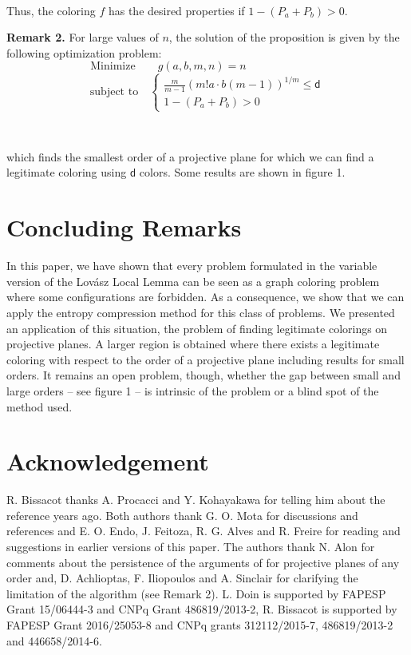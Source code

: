 \documentclass[11pt]{amsart}
\numberwithin{equation}{section}
\begin{document}
\

Thus, the coloring $f$ has the desired properties if $ 1 - (P_a + P_b) > 0$.\\

\medskip

\textbf{Remark 2.} For large values of $n$, the solution of the proposition is given by the following optimization problem:
$$ \text{Minimize} \quad \quad  g(a,b,m,n) = n \quad \quad \quad \quad \quad \quad \quad $$
$$ \text{subject to} \quad \begin{cases}
\frac{m}{m-1}(m!a \cdot b (m-1))^{1/m} \leq \mathsf{d} \\
 1 - (P_a + P_b) > 0

\end{cases} $$

\

which finds the smallest order of a projective plane for which we can find a legitimate coloring using $\mathsf{d}$ colors. Some results are shown in figure 1.

\section{Concluding Remarks}
In this paper, we have shown that every problem formulated in the variable version of the Lov\'asz Local Lemma can be seen as a graph coloring problem where some configurations are forbidden. As a consequence, we show that we can apply the entropy compression method for this class of problems. We presented an application of this situation, the problem of finding legitimate colorings on projective planes. A larger region is obtained where there exists a legitimate coloring with respect to the order of a projective plane including results for small orders. It remains an open problem, though, whether the gap between small and large orders -- see figure 1 -- is intrinsic of the problem or a blind spot of the method used.

\section*{Acknowledgement}

R. Bissacot thanks A. Procacci and Y. Kohayakawa for telling him about the reference \cite{Alon} years ago. Both authors thank G. O. Mota for discussions and references and E. O. Endo, J. Feitoza, R. G. Alves and R. Freire for reading and suggestions in earlier versions of this paper. The authors thank N. Alon for comments about the persistence of the arguments of \cite{Alon} for projective planes of any order and, D. Achlioptas, F. Iliopoulos and A. Sinclair for clarifying the limitation of the algorithm (see Remark 2). L. Doin is supported by FAPESP Grant 15/06444-3 and CNPq Grant 486819/2013-2, R. Bissacot is supported by FAPESP
Grant 2016/25053-8 and CNPq grants 312112/2015-7, 486819/2013-2 and 446658/2014-6.
 
\end{document}
